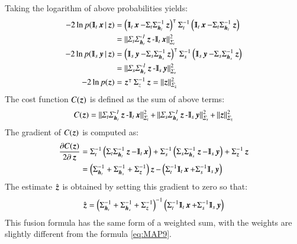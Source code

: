 Taking the logarithm of above probabilities yields:
\begin{equation}
\begin{split}
	-2\ln p(\Interp_t\x |\z ) &= \left(\Interp_t\x -\Sigma_t \Sigma_{\h_t}^{-1}\z  \right)^{\mytrans} \Sigma^{-1}_t \left(\Interp_t\x -\Sigma_t \Sigma_{\h_t}^{-1}\z \right) \\
	&= \Mdist{\Sigma_t \Sigma_{\h_t}^{-1}\z -\Interp_t\x}{\Sigma_t}\\
	-2\ln p(\Interp_s\y |\z ) &=  \left(\Interp_s\y -\Sigma_s \Sigma_{\h_s}^{-1}\z  \right)^{\mytrans} \Sigma^{-1}_s \left(\Interp_s\y -\Sigma_s \Sigma_{\h_s}^{-1}\z \right)\\
	&= \Mdist{\Sigma_s \Sigma_{\h_s}^{-1}\z -\Interp_s\y}{\Sigma_s}\\
	-2\ln p(\z ) &= \z ^{\mytrans} \Sigma^{-1}_z \z  = \Mdist{\z}{\Sigma_{\z }}
\end{split}		
\label{eq:MAP_linearGauss4}
\end{equation}
The cost function $ C(\operatorname{\boldsymbol{z}} ) $ is defined as the sum of above terms:
\begin{equation}
	C(\z ) =\Mdist{\Sigma_t \Sigma_{\h_t}^{-1}\z -\Interp_t\x}{\Sigma_t}  + \Mdist{\Sigma_s \Sigma_{\h_s}^{-1}\z -\Interp_s\y}{\Sigma_s} + \Mdist{\z}{\Sigma_{\z }}
\label{eq:MAP_linearGauss5}
\end{equation}
 The gradient of $ C(\operatorname{\boldsymbol{z}} ) $ is computed as:
\begin{equation}
\begin{split}
	\frac{\partial C(\z )}{2\partial \z } &= \Sigma^{-1}_t \left( \Sigma_t \Sigma_{\h_t}^{-1}\z -\Interp_t\x  \right) + \Sigma^{-1}_s \left( \Sigma_s \Sigma_{\h_s}^{-1}\z -\Interp_s\y  \right) +\Sigma^{-1}_{\z } \z  \nonumber\\
	&= \left( \Sigma_{\h_t}^{-1} + \Sigma_{\h_s}^{-1} + \Sigma^{-1}_{\z } \right) \z  - \left( \Sigma^{-1}_t\Interp_t\x  + \Sigma^{-1}_s\Interp_s\y  \right)
\end{split}	
\label{eq:MAP_linearGauss6}	
\end{equation}
The estimate $ \hat{\operatorname{\boldsymbol{z}} } $ is obtained by setting this gradient to zero so that:
\begin{equation}
	\hat{\z }=\left( \Sigma_{\h_t}^{-1} + \Sigma_{\h_s}^{-1} + \Sigma^{-1}_{\z } \right)^{-1} \left(\Sigma^{-1}_t\Interp_t\x  +\Sigma^{-1}_s\Interp_s\y \right)
\label{eq:MAP_linearGauss7}
\end{equation}
This fusion formula has the same form of a weighted sum, with the weights are slightly different from the formula \ref{eq:MAP9}.

